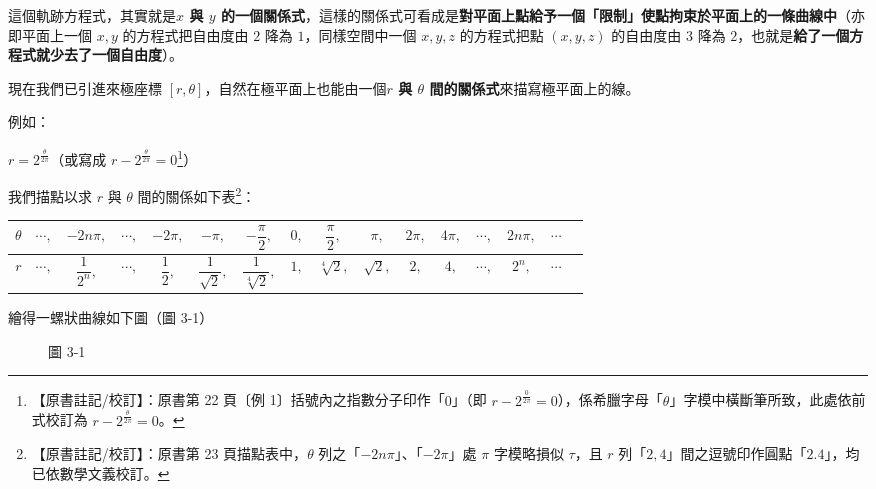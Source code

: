這個軌跡方程式，其實就是\textbf{$x$ 與 $y$ 的一個關係式}，這樣的關係式可看成是\textbf{對平面上點給予一個「限制」使點拘束於平面上的一條曲線中}（亦即平面上一個 $x, y$ 的方程式把自由度由 $2$ 降為 $1$，同樣空間中一個 $x, y, z$ 的方程式把點 $(x, y, z)$ 的自由度由 $3$ 降為 $2$，也就是\textbf{給了一個方程式就少去了一個自由度}）。

現在我們已引進來極座標 $[r, \theta]$，自然在極平面上也能由一個\textbf{$r$ 與 $\theta$ 間的關係式}來描寫極平面上的線。

例如：

\setcounter{example}{0}
\begin{example}\label{ex:b5-1-3-1}
$r = 2^{\frac{\theta}{2\pi}}$（或寫成 $r - 2^{\frac{\theta}{2\pi}} = 0$\label{note:b5-ch1-p22-ex1}\footnote{【原書註記/校訂】：原書第 22 頁〔例 1〕括號內之指數分子印作「$0$」（即 $r - 2^{\frac{0}{2\pi}} = 0$），係希臘字母「$\theta$」字模中橫斷筆所致，此處依前式校訂為 $r - 2^{\frac{\theta}{2\pi}} = 0$。}）

我們描點以求 $r$ 與 $\theta$ 間的關係如下表\label{note:b5-ch1-p23-table}\footnote{【原書註記/校訂】：原書第 23 頁描點表中，$\theta$ 列之「$-2n\pi$」、「$-2\pi$」處 $\pi$ 字模略損似 $\tau$，且 $r$ 列「$2, 4$」間之逗號印作圓點「$2.4$」，均已依數學文義校訂。}：

\begin{center}
\renewcommand{\arraystretch}{1.6}
\setlength{\tabcolsep}{4pt}
\small
\begin{tabular}{c|ccccccccccccccc}
$\theta$ & $\cdots,$ & $-2n\pi,$ & $\cdots,$ & $-2\pi,$ & $-\pi,$ & $-\dfrac{\pi}{2},$ & $0,$ & $\dfrac{\pi}{2},$ & $\pi,$ & $2\pi,$ & $4\pi,$ & $\cdots,$ & $2n\pi,$ & $\cdots$ \\[4pt]
\hline
$r$ & $\cdots,$ & $\dfrac{1}{2^n},$ & $\cdots,$ & $\dfrac{1}{2},$ & $\dfrac{1}{\sqrt{2}},$ & $\dfrac{1}{\sqrt[4]{2}},$ & $1,$ & $\sqrt[4]{2},$ & $\sqrt{2},$ & $2,$ & $4,$ & $\cdots,$ & $2^n,$ & $\cdots$
\end{tabular}
\end{center}

繪得一螺狀曲線如下圖（圖 3-1）

\begin{figure}[H]
\centering
{}
\caption*{圖 3-1}\label{fig:b5-1-3-1}
\end{figure}
\end{example}

